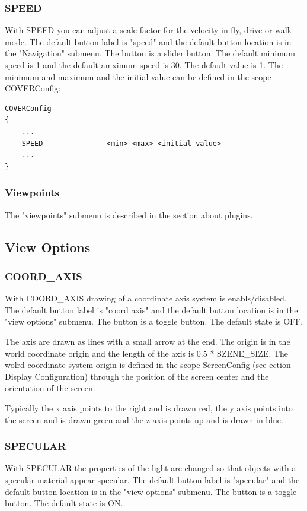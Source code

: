 \subsubsection{SPEED}
With SPEED you can adjust a scale factor for the velocity in fly, drive
or walk mode.
The default button label is "speed" and
the default button location is in the "Navigation" submenu. 
The button is a slider button. The default minimum speed is 1 and 
the default amximum speed is 30. The default value is 1.
The minimum and maximum and the initial value can be defined in the scope
COVERConfig:
\begin{samepage}
\begin{verbatim}
COVERConfig
{
    ...
    SPEED               <min> <max> <initial value>
    ...
}
\end{verbatim}
\end{samepage}

\subsubsection{Viewpoints}

The "viewpoints" submenu is described in the section about plugins.

\subsection{View Options}

\subsubsection{COORD\_AXIS}
With COORD\_AXIS drawing of a coordinate axis system is enabls/disabled. 
The default button label is "coord axis" and
the default button location is in the "view options" submenu. 
The button is a toggle button. The default state is OFF.

The axis are drawn as lines with a small arrow at the end. The origin
is in the world coordinate origin and the length of the axis is
0.5 * SZENE\_SIZE. The wolrd coordinate system origin is defined
in the scope ScreenConfig (see ection Display Configuration) through
the position of the screen center and the orientation of the screen. 

Typically the x axis points to the right and is drawn red, the
y axis points into the screen and is drawn green and the z axis points
up and is drawn in blue.

\subsubsection{SPECULAR}
With SPECULAR the properties of the light are changed so that objects with
a specular material appear specular.
The default button label is "specular" and
the default button location is in the "view options" submenu. 
The button is a toggle button. The default state is ON.

